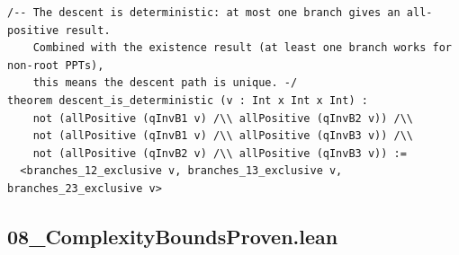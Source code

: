 \documentclass[11pt,openright,twoside]{book}
\theoremstyle{definition}
\begin{document}
\begin{lstlisting}[style=lean]
/-- The descent is deterministic: at most one branch gives an all-positive result.
    Combined with the existence result (at least one branch works for non-root PPTs),
    this means the descent path is unique. -/
theorem descent_is_deterministic (v : Int x Int x Int) :
    not (allPositive (qInvB1 v) /\\ allPositive (qInvB2 v)) /\\
    not (allPositive (qInvB1 v) /\\ allPositive (qInvB3 v)) /\\
    not (allPositive (qInvB2 v) /\\ allPositive (qInvB3 v)) :=
  <branches_12_exclusive v, branches_13_exclusive v, branches_23_exclusive v>

\end{lstlisting}

\clearpage


\subsection*{08\_ComplexityBoundsProven.lean}
\label{lean:08_ComplexityBoundsProven}
\end{document}
